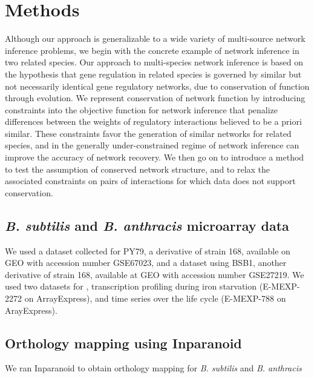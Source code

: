 \documentclass[11pt]{article}
\begin{document}
\section{Methods}
Although our approach is generalizable to a wide variety of multi-source network inference problems, we begin with the concrete example of network inference in two related species. Our approach to multi-species network inference is based on the hypothesis that gene regulation in related species is governed by similar but not necessarily identical gene regulatory networks, due to conservation of function through evolution. We represent conservation of network function by introducing constraints into the objective function for network inference that penalize differences between the weights of regulatory interactions believed to be a priori similar. These constraints favor the generation of similar networks for related species, and in the generally under-constrained regime of network inference can improve the accuracy of network recovery. We then go on to introduce a method to test the assumption of conserved network structure, and to relax the associated constraints on pairs of interactions for which data does not support conservation.

\subsection{\textit{B. subtilis} and \textit{B. anthracis} microarray data}
We used a dataset collected for PY79, a derivative of strain 168, available on GEO with accession number GSE67023, and a dataset using BSB1, another derivative of strain 168, available at GEO with accession number GSE27219. We used two datasets for , transcription profiling during iron starvation (E-MEXP-2272 on ArrayExpress), and time series over the life cycle (E-MEXP-788 on ArayExpress).

\subsection{Orthology mapping using Inparanoid}
We ran Inparanoid to obtain orthology mapping for \textit{B. subtilis} and \textit{B. anthracis} \cite{ostlund_inparanoid_2010}
\end{document}
